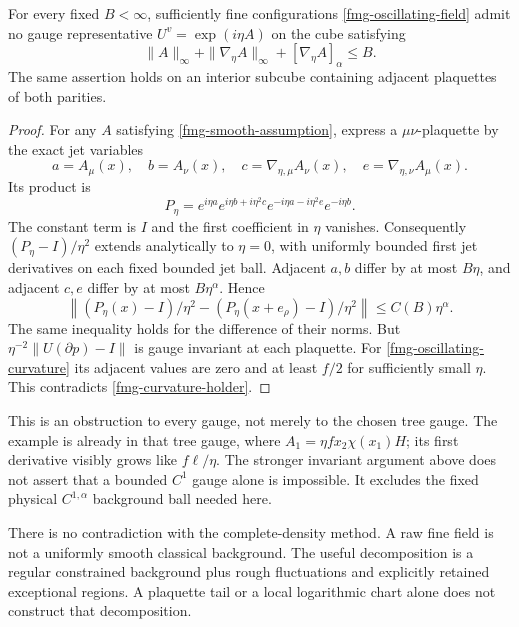 \begin{proposition}
\label{fmg-no-smooth-gauge}
For every fixed \(B<\infty\), sufficiently fine configurations
\eqref{fmg-oscillating-field} admit no gauge representative
\(U^v=\exp(i\eta A)\) on the cube satisfying
\begin{equation}
 \|A\|_\infty+\|\nabla_\eta A\|_\infty
                         +[\nabla_\eta A]_\alpha\le B.
 \label{fmg-smooth-assumption}
\end{equation}
The same assertion holds on an interior subcube containing
adjacent plaquettes of both parities.
\end{proposition}

\begin{proof}
For any \(A\) satisfying \eqref{fmg-smooth-assumption}, express
a \(\mu\nu\)-plaquette by the exact jet variables
\[
 a=A_\mu(x),\quad b=A_\nu(x),\quad
 c=\nabla_{\eta,\mu}A_\nu(x),\quad
 e=\nabla_{\eta,\nu}A_\mu(x).
\]
Its product is
\[
 P_\eta=
 e^{i\eta a}e^{i\eta b+i\eta^2c}
                  e^{-i\eta a-i\eta^2e}e^{-i\eta b}.
\]
The constant term is \(I\) and the first coefficient in \(\eta\)
vanishes. Consequently \((P_\eta-I)/\eta^2\) extends analytically
to \(\eta=0\), with uniformly bounded first jet derivatives
on each fixed bounded jet ball. Adjacent \(a,b\) differ by
at most \(B\eta\), and adjacent \(c,e\) differ by at most
\(B\eta^\alpha\). Hence
\begin{equation}
 \left\|(P_\eta(x)-I)/\eta^2
             -(P_\eta(x+e_\rho)-I)/\eta^2\right\|
                         \le C(B)\eta^\alpha .
 \label{fmg-curvature-holder}
\end{equation}
The same inequality holds for the difference of their norms.
But \(\eta^{-2}\|U(\partial p)-I\|\) is gauge invariant
at each plaquette. For \eqref{fmg-oscillating-curvature}
its adjacent values are zero and at least \(f/2\) for
sufficiently small \(\eta\). This contradicts
\eqref{fmg-curvature-holder}.
\end{proof}

This is an obstruction to every gauge, not merely to the chosen
tree gauge. The example is already in that tree gauge, where
\(A_1=\eta f x_2\chi(x_1)H\); its first derivative visibly grows
like \(f\ell/\eta\). The stronger invariant argument above
does not assert that a bounded \(C^1\) gauge alone is impossible.
It excludes the fixed physical \(C^{1,\alpha}\) background ball
needed here.

There is no contradiction with the complete-density method.
A raw fine field is not a uniformly smooth classical background.
The useful decomposition is a regular constrained background
plus rough fluctuations and explicitly retained exceptional
regions. A plaquette tail or a local logarithmic chart alone
does not construct that decomposition.

